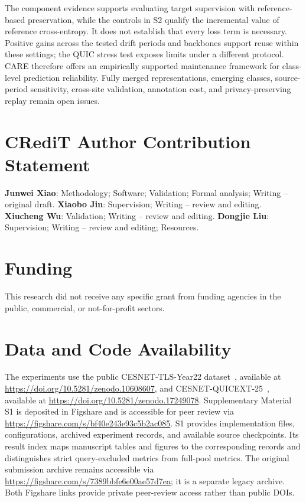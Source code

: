 \documentclass[preprint,12pt,authoryear]{elsarticle}
\let\cite\citep
\begin{document}
The component evidence supports evaluating target supervision with reference-based preservation, while the controls in S2 qualify the incremental value of reference cross-entropy. It does not establish that every loss term is necessary. Positive gains across the tested drift periods and backbones support reuse within these settings; the QUIC stress test exposes limits under a different protocol. CARE therefore offers an empirically supported maintenance framework for class-level prediction reliability. Fully merged representations, emerging classes, source-period sensitivity, cross-site validation, annotation cost, and privacy-preserving replay remain open issues.

\section*{CRediT Author Contribution Statement}
\textbf{Junwei Xiao}: Methodology; Software; Validation; Formal analysis; Writing -- original draft.
\textbf{Xiaobo Jin}: Supervision; Writing -- review and editing.
\textbf{Xiucheng Wu}: Validation; Writing -- review and editing.
\textbf{Dongjie Liu}: Supervision; Writing -- review and editing; Resources.

\section*{Funding}
This research did not receive any specific grant from funding agencies in the public, commercial, or not-for-profit sectors.

\section*{Data and Code Availability}
The experiments use the public CESNET-TLS-Year22 dataset~\cite{hynek2024cesnet}, available at \url{https://doi.org/10.5281/zenodo.10608607}, and CESNET-QUICEXT-25~\cite{cesnetquicext25,mucke2025waiting}, available at \url{https://doi.org/10.5281/zenodo.17249078}. Supplementary Material S1 is deposited in Figshare and is accessible for peer review via \url{https://figshare.com/s/bf40e243e93c5b2ac085}. S1 provides implementation files, configurations, archived experiment records, and available source checkpoints. Its result index maps manuscript tables and figures to the corresponding records and distinguishes strict query-excluded metrics from full-pool metrics. The original submission archive remains accessible via \url{https://figshare.com/s/7389bbfe6e00ae57d7ea}; it is a separate legacy archive. Both Figshare links provide private peer-review access rather than public DOIs.
\end{document}

